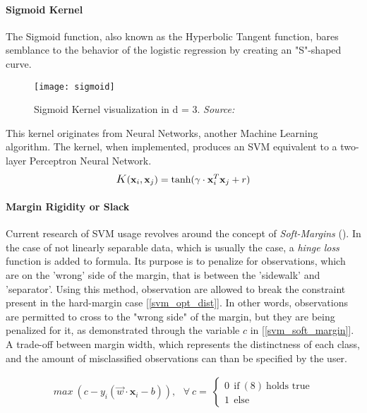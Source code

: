 \paragraph{Sigmoid Kernel}
	The Sigmoid function, also known as the Hyperbolic Tangent function, bares semblance to the behavior of the logistic regression by creating an "S"-shaped curve. 
	
	\begin{figure}[h]
		\centering
		\captionsetup{width=0.8\textwidth}
		\texttt{[image: sigmoid]}
		\caption[Sigmoid Kernel]{
			\footnotesize{
				Sigmoid Kernel visualization in d = 3. \textit{Source:} \cite{carrington2014new}
			}
		}
	\end{figure}
	
	This kernel originates from Neural Networks, another Machine Learning algorithm. The kernel, when implemented, produces an SVM equivalent to a two-layer Perceptron Neural Network.
	\begin{equation}
		\mathlarger{K}(\textbf{x}_i,\textbf{x}_j) = \text{tanh}(\gamma \cdot \textbf{x}^T_i \textbf{x}_j + r)
	\end{equation}
	


\paragraph{Margin Rigidity or Slack}
	Current research of SVM usage revolves around the concept of \textit{Soft-Margins} (\cite{SVM_cortes1995support}). In the case of not linearly separable data, which is usually the case, a \textit{hinge loss} function is added to formula. Its purpose is to penalize for observations, which are on the 'wrong' side of the margin, that is between the 'sidewalk' and 'separator'. Using this method, observation are allowed to break the constraint present in the hard-margin case [\ref{svm_opt_dist}]. In other words, observations are permitted to cross to the "wrong side" of the margin, but they are being penalized for it, as demonstrated through the variable $c$ in [\ref{svm_soft_margin}]. A trade-off between margin width, which represents the distinctness of each class, and the amount of misclassified observations can than be specified by the user.

	\begin{equation}
		\begin{aligned}
			max \ (c - y_i(\vec{w} \cdot \textbf{x}_i - b)), 
			\  \ \ \forall \ c = \ 
			\begin{cases} 
				0 \ \ \text{if} \ (8) \ \text{holds true}\\
				1 \ \ \text{else}
			\end{cases}
		\end{aligned}
		\label{svm_soft_margin}
	\end{equation}

